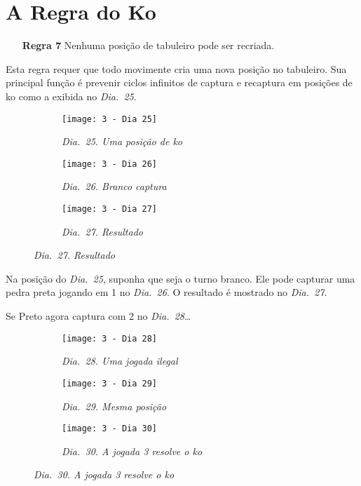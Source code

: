 \chapter{A Regra do Ko}

\begin{itemize}
  \item[\textbf{Regra 7}] Nenhuma posição de tabuleiro pode ser recriada.
\end{itemize}

Esta regra requer que todo movimente cria uma nova posição no tabuleiro. Sua principal função é prevenir ciclos infinitos de captura e recaptura em posições de ko como a exibida no \emph{Dia.\@~25}.

\begin{figure}[h]
  \centering
  \begin{subfigure}{.3\textwidth}
      \centering
      \texttt{[image: 3 - Dia 25]}
      \caption*{\emph{Dia.\@~25. Uma posição de ko}}
  \end{subfigure}
  \begin{subfigure}{.3\textwidth}
      \centering
      \texttt{[image: 3 - Dia 26]}
      \caption*{\emph{Dia.\@~26. Branco captura}}
  \end{subfigure}
  \begin{subfigure}{.3\textwidth}
      \centering
      \texttt{[image: 3 - Dia 27]}
      \caption*{\emph{Dia.\@~27. Resultado}}
  \end{subfigure}
\end{figure}


Na posição do \emph{Dia.\@~25}, suponha que seja o turno branco. Ele pode capturar uma pedra preta jogando em 1 no \emph{Dia.\@~26}. O resultado é mostrado no \emph{Dia.\@~27}.

Se Preto agora captura com 2 no \emph{Dia.\@~28}\ldots

\pagebreak

\begin{figure}[h]
  \centering
  \begin{subfigure}[t]{.3\textwidth}
      \centering
      \texttt{[image: 3 - Dia 28]}
      \caption*{\emph{Dia.\@~28. Uma jogada ilegal}}
  \end{subfigure}
  \begin{subfigure}[t]{.3\textwidth}
      \centering
      \texttt{[image: 3 - Dia 29]}
      \caption*{\emph{Dia.\@~29. Mesma posição}}
  \end{subfigure}
  \begin{subfigure}[t]{.3\textwidth}
      \centering
      \texttt{[image: 3 - Dia 30]}
      \caption*{\emph{Dia.\@~30. A jogada 3 resolve o ko}}
  \end{subfigure}
\end{figure}

